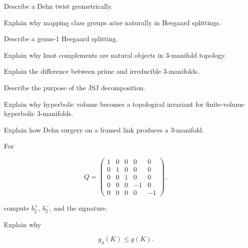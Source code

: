 \begin{exercise}[3]
Describe a Dehn twist geometrically.
\end{exercise}

\begin{exercise}[3]
Explain why mapping class groups arise naturally in Heegaard splittings.
\end{exercise}

\begin{exercise}[3]
Describe a genus-\(1\) Heegaard splitting.
\end{exercise}

\begin{exercise}[3]
Explain why knot complements are natural objects in \(3\)-manifold topology.
\end{exercise}

\begin{exercise}[3]
Explain the difference between prime and irreducible \(3\)-manifolds.
\end{exercise}

\begin{exercise}[3]
Describe the purpose of the JSJ decomposition.
\end{exercise}

\begin{exercise}[3]
Explain why hyperbolic volume becomes a topological invariant for
finite-volume hyperbolic \(3\)-manifolds.
\end{exercise}

\begin{exercise}[3]
Explain how Dehn surgery on a framed link produces a \(3\)-manifold.
\end{exercise}

\begin{exercise}[3]
For

\[
Q=
\begin{pmatrix}
1&0&0&0&0\\
0&1&0&0&0\\
0&0&1&0&0\\
0&0&0&-1&0\\
0&0&0&0&-1
\end{pmatrix},
\]

compute \(b_2^+\), \(b_2^-\), and the signature.
\end{exercise}

\begin{exercise}[3]
Explain why

\[
g_4(K)\leq g(K).
\]
\end{exercise}

